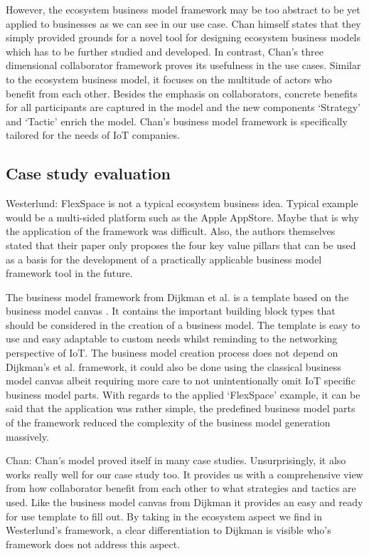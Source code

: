 		However, the ecosystem business model framework may be too abstract to be yet applied to businesses as we can see in our use case. Chan himself states that they simply provided grounds for a novel tool for designing ecosystem business models which has to be further studied and developed. In contrast, Chan's three dimensional collaborator framework proves its usefulness in the use cases. Similar to the ecosystem business model, it focuses on the multitude of actors who benefit from each other. Besides the emphasis on collaborators, concrete benefits for all participants are captured in the model and the new components `Strategy' and `Tactic' enrich the model. Chan's business model framework is specifically tailored for the needs of IoT companies.	
	
	\subsection{Case study evaluation}
		Westerlund: FlexSpace is not a typical ecosystem business idea. Typical example would be a multi-sided platform such as the Apple AppStore. Maybe that is why the application of the framework was difficult. Also, the authors themselves stated that their paper only proposes the four key value pillars that can be used as a basis for the development of a practically applicable business model framework tool in the future.

		The business model framework from Dijkman et al. \cite{dijkman} is a template based on the business model canvas \cite{bmc}. It contains the important building block types that should be considered in the creation of a business model. The template is easy to use and easy adaptable to custom needs whilst reminding to the networking perspective of IoT. The business model creation process does not depend on Dijkman's et al. framework, it could also be done using the classical business model canvas albeit requiring more care to not unintentionally omit IoT specific business model parts.
		With regards to the applied `FlexSpace' example, it can be said that the application was rather simple, the predefined business model parts of the framework reduced the complexity of the business model generation massively.

		Chan: Chan's model proved itself in many case studies. Unsurprisingly, it also works really well for our case study too. It provides us with a comprehensive view from how collaborator benefit from each other to what strategies and tactics are used. Like the business model canvas from Dijkman it provides an easy and ready for use template to fill out. By taking in the ecosystem aspect we find in Westerlund's framework, a clear differentiation to Dijkman is visible who's framework does not address this aspect. 

